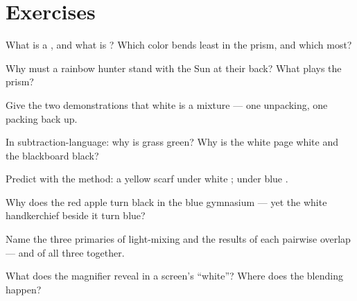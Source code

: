 \section{Exercises}

\begin{exercise}[$\star$]\label{exo:g8:colors-spectra:1}
What is a , and what is ? Which color bends
least in the prism, and which most?
\end{exercise}

\begin{exercise}[$\star$]\label{exo:g8:colors-spectra:2}
Why must a rainbow hunter stand with the Sun at their back?
What plays the prism?
\end{exercise}

\begin{exercise}[$\star$]\label{exo:g8:colors-spectra:3}
Give the two demonstrations that white  is a mixture ---
one unpacking, one packing back up.
\end{exercise}

\begin{exercise}[$\star$]\label{exo:g8:colors-spectra:4}
In subtraction-language: why is grass green? Why is the white
page white and the blackboard black?
\end{exercise}

\begin{exercise}[$\star$]\label{exo:g8:colors-spectra:5}
Predict with the method: a yellow scarf under white ;
under blue .
\end{exercise}

\begin{exercise}[$\star$]\label{exo:g8:colors-spectra:6}
Why does the red apple turn black in the blue gymnasium ---
yet the white handkerchief beside it turn blue?
\end{exercise}

\begin{exercise}[$\star$]\label{exo:g8:colors-spectra:7}
Name the three primaries of light-mixing and the results of
each pairwise overlap --- and of all three together.
\end{exercise}

\begin{exercise}[$\star$]\label{exo:g8:colors-spectra:8}
What does the magnifier reveal in a screen's ``white''? Where
does the blending happen?
\end{exercise}

